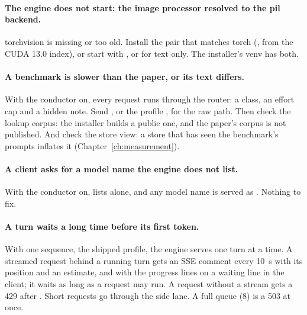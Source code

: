 \paragraph{The engine does not start: the image processor resolved to the pil backend.} torchvision is missing or too old. Install the pair that matches torch (,  from the CUDA 13.0 index), or start with , or  for text only. The installer's venv has both.

\paragraph{A benchmark is slower than the paper, or its text differs.} With the conductor on, every request runs through the router: a class, an effort cap and a hidden note. Send , or the profile , for the raw path. Then check the lookup corpus: the installer builds a public one, and the paper's corpus is not published. And check the store view: a store that has seen the benchmark's prompts inflates it (Chapter~\ref{ch:measurement}).

\paragraph{A client asks for a model name the engine does not list.} With the conductor on,  lists  alone, and any model name is served as . Nothing to fix.

\paragraph{A turn waits a long time before its first token.} With one sequence, the shipped profile, the engine serves one turn at a time. A streamed request behind a running turn gets an SSE comment every 10~s with its position and an estimate, and with the progress lines on a waiting line in the client; it waits as long as a request may run. A request without a stream gets a 429 after . Short requests go through the side lane. A full queue (8) is a 503 at once.

